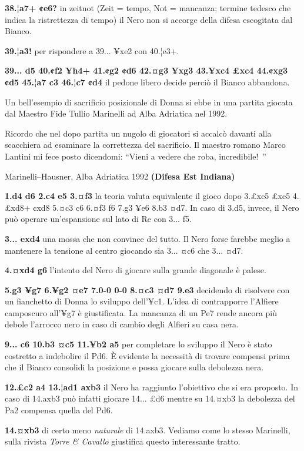\textbf{38.¦a7+ ¢e6?} in zeitnot (Zeit = tempo, Not = mancanza; termine
tedesco che indica la ristrettezza di tempo) il Nero non si accorge
della difesa escogitata dal Bianco.

\textbf{39.¦a3!} per rispondere a 39... ¥xe2 con 40.¦e3+.

\textbf{39... d5 40.¢f2 ¥h4+ 41.¢g2 ¢d6 42.¤g3 ¥xg3 43.¥xc4 £xc4 44.¢xg3
¢d5 45.¦a7 c3 46.¦c7 ¢d4} il pedone libero decide perciò il Bianco
abbandona.

Un bell'esempio di sacrificio posizionale di Donna si ebbe in una
partita giocata dal Maestro Fide Tullio Marinelli ad Alba Adriatica nel
1992.

Ricordo che nel dopo partita un nugolo di giocatori si accalcò davanti
alla scacchiera ad esaminare la correttezza del sacrificio. Il maestro
romano Marco Lantini mi fece posto dicendomi: ``Vieni a vedere che roba,
incredibile!~''

Marinelli--Hausner, Alba Adriatica 1992 \textbf{(Difesa Est Indiana)}

\textbf{1.d4 d6 2.c4 e5 3.¤f3} la teoria valuta equivalente il gioco
dopo 3.£xe5 £xe5 4.£xd8+ ¢xd8 5.¤c3 c6 6.¤f3 f6 7.g3 ¥e6 8.b3 ¤d7. In
caso di 3.d5, invece, il Nero può operare un'espansione sul lato di Re
con 3... f5.

\textbf{3... exd4} una mossa che non convince del tutto. Il Nero forse
farebbe meglio a mantenere la tensione al centro giocando sia 3... ¤c6
che 3... ¤d7.

\textbf{4.¤xd4 g6} l'intento del Nero di giocare sulla grande diagonale
è palese.

\textbf{5.g3 ¥g7 6.¥g2 ¤e7 7.0-0 0-0 8.¤c3 ¤d7 9.e3} decidendo di
risolvere con un fianchetto di Donna lo sviluppo dell'¥c1. L'idea di
contrapporre l'Alfiere camposcuro all'¥g7 è giustificata. La mancanza di
un Pe7 rende ancora più debole l'arrocco nero in caso di cambio degli
Alfieri su casa nera.

\textbf{9... c6 10.b3 ¤c5 11.¥b2 a5} per completare lo sviluppo il Nero
è stato costretto a indebolire il Pd6. È evidente la necessità di
trovare compensi prima che il Bianco consolidi la posizione e possa
giocare sulla debolezza nera.

\textbf{12.£c2 a4 13.¦ad1 axb3} il Nero ha raggiunto l'obiettivo che si
era proposto. In caso di 14.axb3 può infatti giocare 14... £d6 mentre su
14.¤xb3 la debolezza del Pa2 compensa quella del Pd6.

\textbf{14.¤xb3} di certo meno \emph{naturale} di 14.axb3. Vediamo come
lo stesso Marinelli, sulla rivista \emph{Torre \& Cavallo} giustifica
questo interessante tratto.

